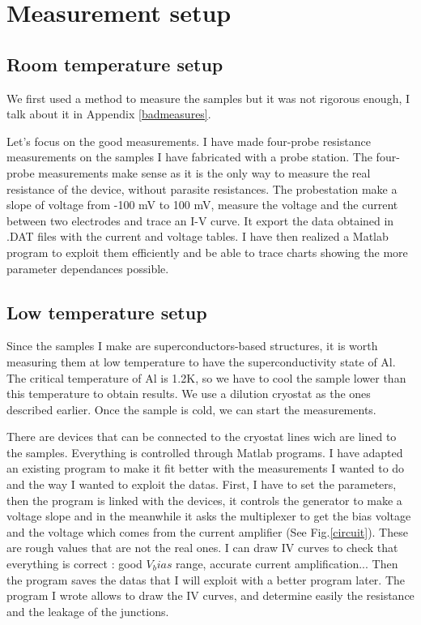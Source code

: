             \section{Measurement setup}
            \subsection{Room temperature setup}
            
            We first used a method to measure the samples but it was not rigorous enough, I talk about it in Appendix \ref{badmeasures}.
                
                Let's focus on the good measurements. I have made four-probe resistance measurements on the samples I have fabricated with a probe station. The four-probe measurements make sense as it is the only way to measure the real resistance of the device, without parasite resistances. The probestation make a slope of voltage from -100 mV to 100 mV, measure the voltage and the current between two electrodes and trace an I-V curve. It export the data obtained in .DAT files with the current and voltage tables. I have then realized a Matlab program to exploit them efficiently and be able to trace charts showing the more parameter dependances possible.
                
            \subsection{Low temperature setup}
                
                Since the samples I make are superconductors-based structures, it is worth measuring them at low temperature to have the superconductivity state of Al. The critical temperature of Al is 1.2K, so we have to cool the sample lower than this temperature to obtain results. We use a dilution cryostat as the ones described earlier. Once the sample is cold, we can start the measurements.
                
                There are devices that can be connected to the cryostat lines wich are lined to the samples. Everything is controlled through Matlab programs. I have adapted an existing program to make it fit better with the measurements I wanted to do and the way I wanted to exploit the datas. First, I have to set the parameters, then the program is linked with the devices, it controls the generator to make a voltage slope and in the meanwhile it asks the multiplexer to get the bias voltage and the voltage which comes from the current amplifier (See Fig.\ref{circuit}). These are rough values that are not the real ones. I can draw IV curves to check that everything is correct : good $V_bias$ range, accurate current amplification... Then the program saves the datas that I will exploit with a better program later. The program I wrote allows to draw the IV curves, and determine easily the resistance and the leakage of the junctions.
                                

